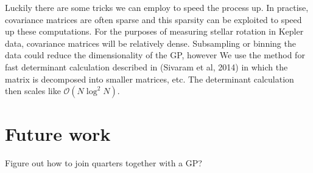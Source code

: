 \documentclass[12pt,preprint]{aastex}
\begin{document}
Luckily there are some tricks we can employ to speed the process up. %
In practise, covariance matrices are often sparse and this sparsity can be exploited to speed up these computations.
For the purposes of measuring stellar rotation in Kepler data, covariance matrices will be relatively dense.
Subsampling or binning the data could reduce the dimensionality of the GP, however %
We use the method for fast determinant calculation described in (Sivaram et al, 2014) in which the matrix is decomposed into smaller matrices, etc.
The determinant calculation then scales like $\mathcal{O}(N\log^2{N})$.

\section{Future work}

Figure out how to join quarters together with a GP?
\end{document}
